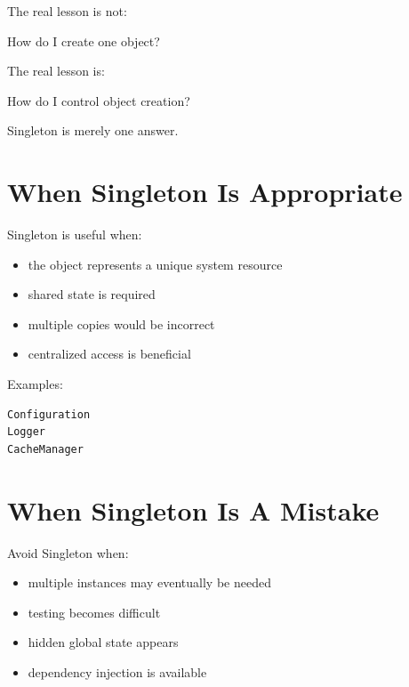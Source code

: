\documentclass[11pt,a4paper]{book}
\begin{document}
The real lesson is not:

\begin{center}
How do I create one object?
\end{center}

The real lesson is:

\begin{center}
How do I control object creation?
\end{center}

Singleton is merely one answer.


\section{When Singleton Is Appropriate}

Singleton is useful when:

\begin{itemize}

\item the object represents a unique system resource
\item shared state is required
\item multiple copies would be incorrect
\item centralized access is beneficial

\end{itemize}

Examples:

\begin{verbatim}
Configuration
Logger
CacheManager
\end{verbatim}


\section{When Singleton Is A Mistake}

Avoid Singleton when:

\begin{itemize}

\item multiple instances may eventually be needed
\item testing becomes difficult
\item hidden global state appears
\item dependency injection is available

\end{itemize}
\end{document}

